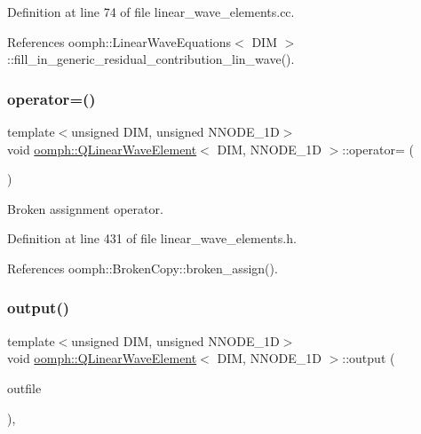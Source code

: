 Definition at line 74 of file linear\+\_\+wave\+\_\+elements.\+cc.



References oomph\+::\+Linear\+Wave\+Equations$<$ D\+I\+M $>$\+::fill\+\_\+in\+\_\+generic\+\_\+residual\+\_\+contribution\+\_\+lin\+\_\+wave().

\mbox{\label{classoomph_1_1QLinearWaveElement_acd9fed2d3150d2e129a80b7df54dfb71}} 
\subsubsection{\texorpdfstring{operator=()}{operator=()}}
{\footnotesize\ttfamily template$<$unsigned D\+IM, unsigned N\+N\+O\+D\+E\+\_\+1D$>$ \\
void \hyperlink{classoomph_1_1QLinearWaveElement}{oomph\+::\+Q\+Linear\+Wave\+Element}$<$ D\+IM, N\+N\+O\+D\+E\+\_\+1D $>$\+::operator= (\begin{DoxyParamCaption}\item[{const \hyperlink{classoomph_1_1QLinearWaveElement}{Q\+Linear\+Wave\+Element}$<$ D\+IM, N\+N\+O\+D\+E\+\_\+1D $>$ \&}]{ }\end{DoxyParamCaption})\hspace{0.3cm}{\ttfamily [inline]}}



Broken assignment operator. 



Definition at line 431 of file linear\+\_\+wave\+\_\+elements.\+h.



References oomph\+::\+Broken\+Copy\+::broken\+\_\+assign().

\mbox{\label{classoomph_1_1QLinearWaveElement_ae7176ab05b31f360cc7c774e857242d9}} 
\subsubsection{\texorpdfstring{output()}{output()}\hspace{0.1cm}{\footnotesize\ttfamily [1/4]}}
{\footnotesize\ttfamily template$<$unsigned D\+IM, unsigned N\+N\+O\+D\+E\+\_\+1D$>$ \\
void \hyperlink{classoomph_1_1QLinearWaveElement}{oomph\+::\+Q\+Linear\+Wave\+Element}$<$ D\+IM, N\+N\+O\+D\+E\+\_\+1D $>$\+::output (\begin{DoxyParamCaption}\item[{std\+::ostream \&}]{outfile }\end{DoxyParamCaption})\hspace{0.3cm}{\ttfamily [inline]}, {\ttfamily [virtual]}}



